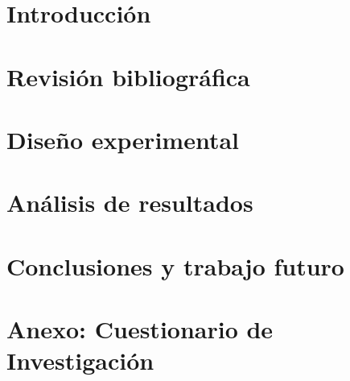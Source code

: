\documentclass[11pt,a4paper,twoside]{tesis}
\begin{document}

\def\autor{Lucía Parral}
\def\tituloTesis{Misconceptions de Ciencias de la Computación 
en niños/as escolarizados/as}
\def\runtitulo{Resumen}
\def\runtitle{Abstract}
\def\director{Herman Schinca}
\def\codirector{Fernando Schapachnik}
\def\lugar{Buenos Aires/Berlin, 2021}


\frontmatter
\pagestyle{empty}


\clearpage

\clearpage

\cleardoublepage
\tableofcontents

\mainmatter
\pagestyle{headings}


\chapter{Introducción}

\chapter{Revisión bibliográfica}

\chapter{Diseño experimental}

\chapter{Análisis de resultados}

\chapter{Conclusiones y trabajo futuro}

\chapter{Anexo: Cuestionario de Investigación}
\label{chap:anexo}


\printbibliography %

\backmatter
%
\end{document}
